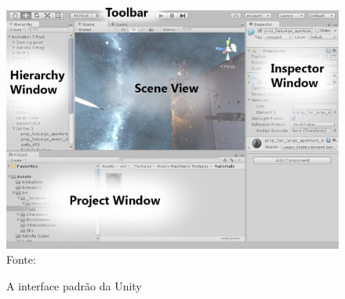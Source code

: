 \documentclass[
	12pt,					%
	openright,				%
	oneside,				%
	a4paper,				%
	bibjustif,				%
	chapter=TITLE,			%
	english,				%
	brazil,					%
	]{abntex2}
\newcommand{\source}[1]{\small Fonte: {#1}}
\begin{document}
			\begin{figure}[ht!]
				\caption{A interface padrão da Unity}
				\centering
				\includegraphics[scale=0.65]{img/InterfaceUnity.jpg}\\
				\vspace{0.5mm}
				\source{}
				\label{fig:interfaceUnity}
			\end{figure}
			
\end{document}
